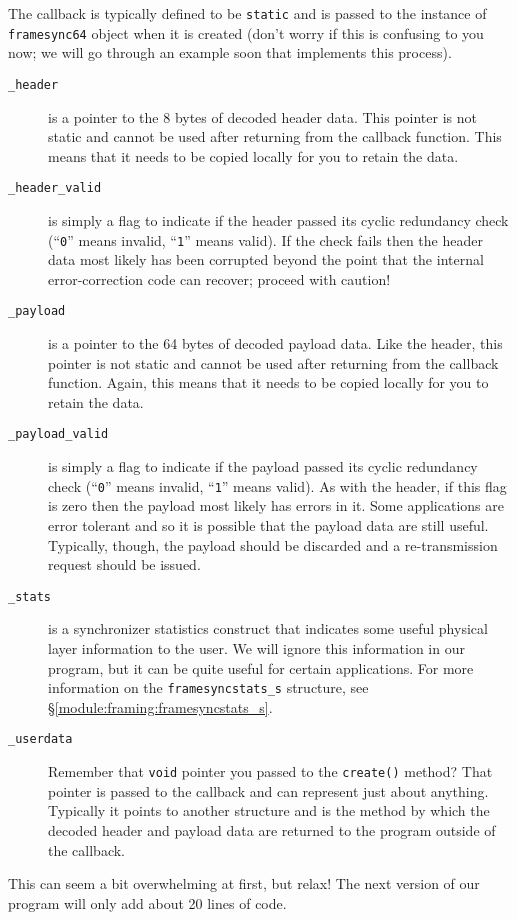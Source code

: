%
The callback is typically defined to be {\tt static} and is passed to
the instance of {\tt framesync64} object when it is created
(don't worry if this is confusing to you now; we will go through an
example soon that implements this process).
%
\begin{description}
\item[{\tt \_header}]
    is a pointer to the 8 bytes of decoded header data.
    This pointer is not static and cannot be used after returning from
    the callback function.
    This means that it needs to be copied locally for you to retain the
    data.
\item[{\tt \_header\_valid}]
    is simply a flag to indicate if the header passed its cyclic
    redundancy check
    (``{\tt 0}'' means invalid, ``{\tt 1}'' means valid).
    If the check fails then the header data most likely has been
    corrupted beyond the point that the internal error-correction code
    can recover; proceed with caution!
\item[{\tt \_payload}]
    is a pointer to the 64 bytes of decoded payload data.
    Like the header,
    this pointer is not static and cannot be used after returning from
    the callback function.
    Again, this means that it needs to be copied locally for you to retain the
    data.
\item[{\tt \_payload\_valid}]
    is simply a flag to indicate if the payload passed its cyclic
    redundancy check
    (``{\tt 0}'' means invalid, ``{\tt 1}'' means valid).
    As with the header,
    if this flag is zero then the payload most likely has errors in it.
    Some applications are error tolerant and so it is possible that the
    payload data are still useful.
    Typically, though, the payload should be discarded and a
    re-transmission request should be issued.
\item[{\tt \_stats}]
    is a synchronizer statistics construct that indicates some useful
    physical layer information to the user.
    We will ignore this information in our program, but it can be quite
    useful for certain applications.
    For more information on the {\tt framesyncstats\_s} structure, see
    \S\ref{module:framing:framesyncstats_s}.
\item[{\tt \_userdata}]
    Remember that {\tt void} pointer you passed to the {\tt create()}
    method?
    That pointer is passed to the callback and can represent just about
    anything.
    Typically it points to another structure and is the method
    by which the decoded header and payload data are returned to the
    program outside of the callback.
\end{description}
%
This can seem a bit overwhelming at first, but relax!
The next version of our program will only add about 20 lines of code.


